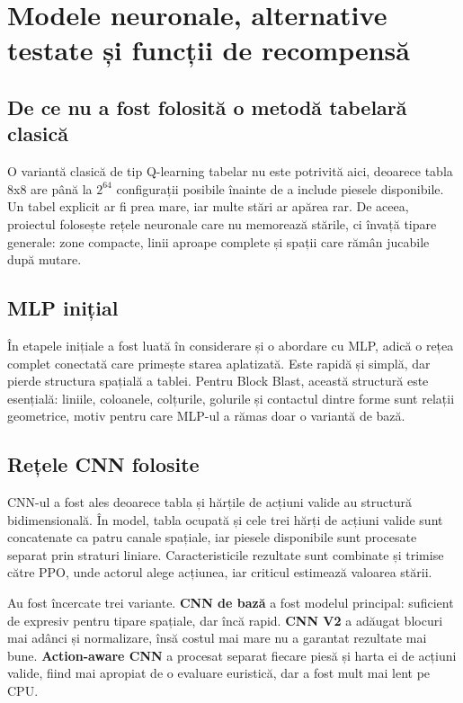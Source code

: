 \documentclass[12pt,a4paper]{article}
\begin{document}
\section{Modele neuronale, alternative testate și funcții de recompensă}

\subsection{De ce nu a fost folosită o metodă tabelară clasică}

O variantă clasică de tip Q-learning tabelar nu este potrivită aici, deoarece tabla 8x8 are până la $2^{64}$ configurații posibile înainte de a include piesele disponibile. Un tabel explicit ar fi prea mare, iar multe stări ar apărea rar. De aceea, proiectul folosește rețele neuronale care nu memorează stările, ci învață tipare generale: zone compacte, linii aproape complete și spații care rămân jucabile după mutare.

\subsection{MLP inițial}

În etapele inițiale a fost luată în considerare și o abordare cu MLP, adică o rețea complet conectată care primește starea aplatizată. Este rapidă și simplă, dar pierde structura spațială a tablei. Pentru Block Blast, această structură este esențială: liniile, coloanele, colțurile, golurile și contactul dintre forme sunt relații geometrice, motiv pentru care MLP-ul a rămas doar o variantă de bază.

\subsection{Rețele CNN folosite}

CNN-ul a fost ales deoarece tabla și hărțile de acțiuni valide au structură bidimensională. În model, tabla ocupată și cele trei hărți de acțiuni valide sunt concatenate ca patru canale spațiale, iar piesele disponibile sunt procesate separat prin straturi liniare. Caracteristicile rezultate sunt combinate și trimise către PPO, unde actorul alege acțiunea, iar criticul estimează valoarea stării.

Au fost încercate trei variante. \textbf{CNN de bază} a fost modelul principal: suficient de expresiv pentru tipare spațiale, dar încă rapid. \textbf{CNN V2} a adăugat blocuri mai adânci și normalizare, însă costul mai mare nu a garantat rezultate mai bune. \textbf{Action-aware CNN} a procesat separat fiecare piesă și harta ei de acțiuni valide, fiind mai apropiat de o evaluare euristică, dar a fost mult mai lent pe CPU.
\end{document}
